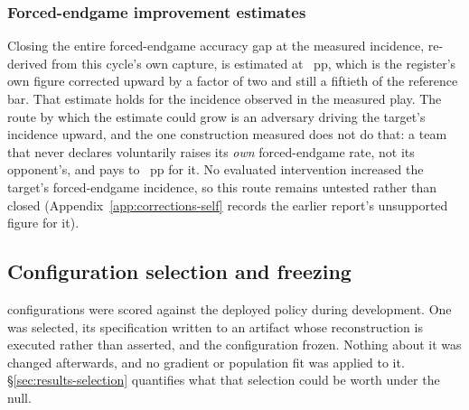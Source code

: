 \subsubsection{Forced-endgame improvement estimates}
\label{sec:development-arithmetic}

Closing the entire forced-endgame accuracy gap at the measured incidence, re-derived from this
cycle's own capture, is estimated at \vsevenLthirteenClose{}~pp, which is the register's own figure
corrected upward by a factor of two and still a fiftieth of the reference bar. That estimate holds
for the incidence observed in the measured play. The route by which the estimate could grow is an
adversary driving the target's incidence upward, and the one construction measured does not do
that: a team that never declares voluntarily raises its \emph{own} forced-endgame rate, not its
opponent's, and pays \vsevenLthirteenAdvCostLo{} to \vsevenLthirteenAdvCostHi{}~pp for it. No
evaluated intervention increased the target's forced-endgame incidence, so this route remains
untested rather than closed (Appendix~\ref{app:corrections-self} records the earlier report's
unsupported figure for it).

\subsection{Configuration selection and freezing}
\label{sec:development-freeze}

\vsevenSelK{} configurations were scored against the deployed policy during development. One was
selected, its specification written to an artifact whose reconstruction is executed rather than
asserted, and the configuration frozen. Nothing about it was changed afterwards, and no gradient or population fit was applied to it. \S\ref{sec:results-selection} quantifies what that selection could be worth
under the null.
